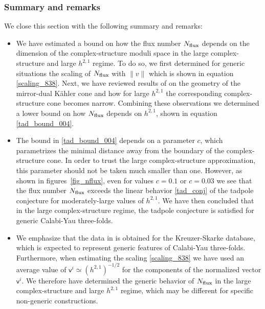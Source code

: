 \documentclass[12pt,a4paper]{article}
\numberwithin{equation}{section}
\begin{document}

\subsubsection*{Summary and remarks}


We close this section with the following summary and remarks:
\begin{itemize}

\item We have estimated a  bound on how the flux number 
$N_{\rm flux}$ depends on the dimension of the 
complex-structure moduli space  
in the large complex-structure 
and large $h^{2,1}$ regime.  
To do so, 
we first determined for generic situations the scaling of 
$N_{\rm flux}$ with  $\lVert  v \rVert$
 which is shown in equation \eqref{scaling_838}.
Next, we have reviewed results of \cite{Demirtas:2018akl} 
on the geometry of the mirror-dual K\"ahler cone and how for 
large $h^{2,1}$ the corresponding complex-structure cone becomes narrow. 
Combining these observations we determined a lower bound on how  $N_{\rm flux}$ depends
on $h^{2,1}$, shown in equation \eqref{tad_bound_004}.


\item The bound in \eqref{tad_bound_004} depends on a parameter $c$, 
which parametrizes the minimal distance away from the 
boundary of the complex-structure cone. 
In order to  trust the large complex-structure approximation, this parameter
should not be  taken  much smaller than one. 
However, as shown in figures~\ref{fig_nflux}, even for values $c=0.1$ or $c=0.03$
we see that  the flux number $N_{\rm flux}$ 
exceeds the linear behavior \eqref{tad_conj} of the tadpole conjecture for moderately-large values of $h^{2,1}$. 
We have then concluded that in the large complex-structure regime, 
the tadpole conjecture is satisfied for generic Calabi-Yau three-folds. 


\item We emphasize that the data in \cite{Demirtas:2018akl} 
is obtained for the Kreuzer-Skarke data\-base, which is expected to 
represent generic features of Calabi-Yau three-folds. 
Furthermore, when estimating the scaling \eqref{scaling_838} we have 
used an average value of $\mathsf v^i \simeq (h^{2,1})^{-1/2}$ for 
the components of the normalized vector $\mathsf v^i$.
We therefore have determined the generic behavior of $N_{\rm flux}$
in the large complex-structure and large $h^{2,1}$ regime,
which may be different for specific non-generic constructions. 




\end{itemize}
\end{document}
